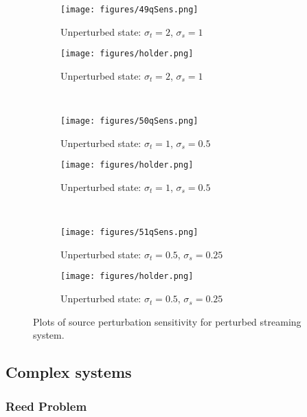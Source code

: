 \documentclass{article}
\newcommand{\sigt}{\sigma_t}
\newcommand{\sigs}{\sigma_s}
\begin{document}
\begin{figure}[H]
\label{InHomoPertq}
\centering
\begin{subfigure}{.5\textwidth}
  \centering
  \texttt{[image: figures/49qSens.png]}
  \caption{Unperturbed state: $\sigt=2$, $\sigs=1$}
  \label{fig:sfig1}
\end{subfigure}%
\begin{subfigure}{.5\textwidth}
  \centering
  \texttt{[image: figures/holder.png]}
  \caption{Unperturbed state: $\sigt=2$, $\sigs=1$}
  \label{fig:sfig4}
\end{subfigure}%
\\
\begin{subfigure}{.5\textwidth}
  \centering
  \texttt{[image: figures/50qSens.png]}
  \caption{Unperturbed state: $\sigt=1$, $\sigs=0.5$}
  \label{fig:sfig2}
\end{subfigure}%
\begin{subfigure}{.5\textwidth}
  \centering
  \texttt{[image: figures/holder.png]}
  \caption{Unperturbed state: $\sigt=1$, $\sigs=0.5$}
  \label{fig:sfig5}
\end{subfigure}%
\\
\begin{subfigure}{.5\textwidth}
  \centering
  \texttt{[image: figures/51qSens.png]}
  \caption{Unperturbed state: $\sigt=0.5$, $\sigs=0.25$}
  \label{fig:sfig3}
\end{subfigure}%
\begin{subfigure}{.5\textwidth}
  \centering
  \texttt{[image: figures/holder.png]}
  \caption{Unperturbed state: $\sigt=0.5$, $\sigs=0.25$}
  \label{fig:sfig6}
\end{subfigure}%
\caption{Plots of source perturbation sensitivity for perturbed streaming system.}
\label{fig:fig}
\end{figure}


\subsection{Complex systems}
\subsubsection{Reed Problem}
\end{document}
